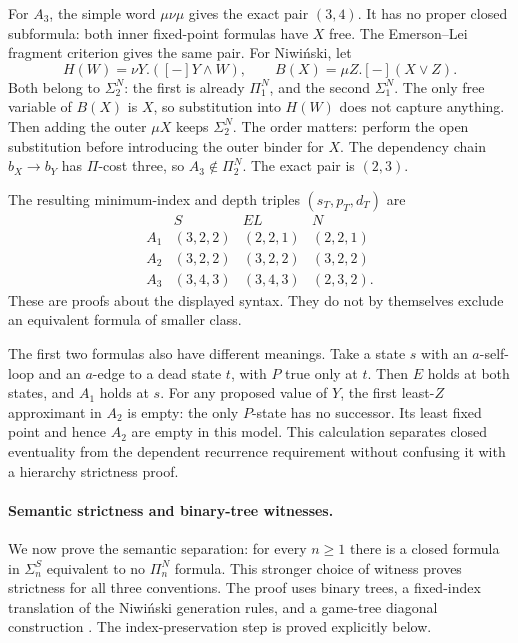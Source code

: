 For \(A_3\), the simple
word \(\mu\nu\mu\) gives
the exact pair \((3,4)\).
It has no proper closed
subformula: both inner
fixed-point formulas have
\(X\) free.
The Emerson--Lei fragment
criterion gives the same
pair. For Niwi\'nski,
let
\[
 H(W)=\nu Y.([-]Y\land W),\qquad
 B(X)=\mu Z.[-](X\lor Z).
\]
Both belong to \(\Sigma_2^N\):
the first is already
\(\Pi_1^N\), and the
second \(\Sigma_1^N\).
The only free variable
of \(B(X)\) is \(X\),
so substitution into
\(H(W)\) does not capture
anything. Then adding
the outer \(\mu X\)
keeps \(\Sigma_2^N\).
The order matters:
perform the open substitution
before introducing the
outer binder for \(X\).
The dependency chain
\(b_X\to b_Y\) has
\(\Pi\)-cost three,
so \(A_3\notin\Pi_2^N\).
The exact pair is \((2,3)\).

The resulting minimum-index
and depth triples
\((s_T,p_T,d_T)\) are
\[
\begin{array}{c|ccc}
       &S&EL&N\\ \hline
 A_1&(3,2,2)&(2,2,1)&(2,2,1)\\
 A_2&(3,2,2)&(3,2,2)&(3,2,2)\\
 A_3&(3,4,3)&(3,4,3)&(2,3,2).
\end{array}
\]
These are proofs about
the displayed syntax.
They do not by themselves
exclude an equivalent
formula of smaller class.

The first two formulas
also have different meanings.
Take a state \(s\) with
an \(a\)-self-loop and
an \(a\)-edge to a dead
state \(t\), with \(P\)
true only at \(t\).
Then \(E\) holds at
both states, and \(A_1\)
holds at \(s\).
For any proposed value
of \(Y\), the first
least-\(Z\) approximant
in \(A_2\) is empty:
the only \(P\)-state
has no successor.
Its least fixed point
and hence \(A_2\) are
empty in this model.
This calculation separates
closed eventuality from
the dependent recurrence
requirement without confusing
it with a hierarchy
strictness proof.

\paragraph{Semantic strictness and binary-tree witnesses.}
\label{sec:p09-mu-alternation-strictness-proof}
We now prove the semantic
separation: for every \(n\geq1\)
there is a closed formula
in \(\Sigma_n^S\) equivalent
to no \(\Pi_n^N\) formula.
This stronger choice of
witness proves strictness
for all three conventions.
The proof uses binary trees,
a fixed-index translation
of the Niwi\'nski generation
rules, and a game-tree
diagonal construction
\cite[\S\S2--3]{Arnold1999BinaryHierarchy}.
The index-preservation step
is proved explicitly below.

